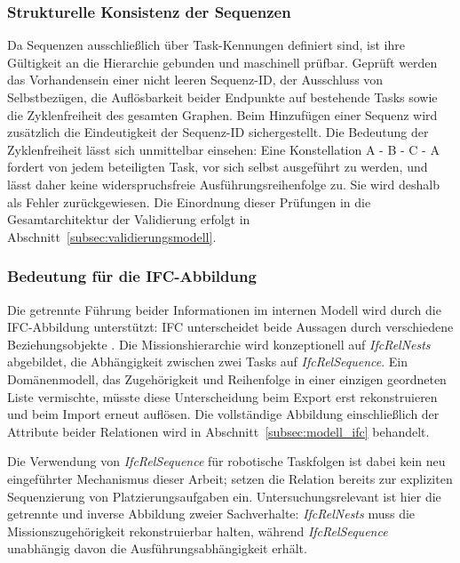 \subsubsection{Strukturelle Konsistenz der Sequenzen}
Da Sequenzen ausschließlich über Task-Kennungen definiert sind, ist ihre Gültigkeit an die
Hierarchie gebunden und maschinell prüfbar. Geprüft werden das Vorhandensein einer nicht leeren
Sequenz-ID, der Ausschluss von Selbstbezügen, die Auflösbarkeit beider Endpunkte auf bestehende
Tasks sowie die Zyklenfreiheit des gesamten Graphen. Beim Hinzufügen einer Sequenz wird zusätzlich
die Eindeutigkeit der Sequenz-ID sichergestellt. Die Bedeutung der Zyklenfreiheit lässt sich
unmittelbar einsehen: Eine Konstellation A - B - C - A
fordert von jedem beteiligten Task, vor sich selbst ausgeführt zu werden, und lässt daher keine
widerspruchsfreie Ausführungsreihenfolge zu. Sie wird deshalb als Fehler zurückgewiesen. Die
Einordnung dieser Prüfungen in die Gesamtarchitektur der Validierung erfolgt in
Abschnitt~\ref{subsec:validierungsmodell}.


\subsubsection{Bedeutung für die IFC-Abbildung}
Die getrennte Führung beider Informationen im internen Modell wird durch die IFC-Abbildung
unterstützt: IFC unterscheidet beide Aussagen durch verschiedene Beziehungsobjekte
\parencite{buildingsmart2024ifc43}. Die
Missionshierarchie wird konzeptionell auf \textit{IfcRelNests} abgebildet,
die Abhängigkeit zwischen zwei Tasks auf \textit{IfcRelSequence}. Ein Domänenmodell, das
Zugehörigkeit und Reihenfolge in einer einzigen geordneten Liste vermischte, müsste diese
Unterscheidung beim Export erst rekonstruieren und beim Import erneut auflösen. Die vollständige
Abbildung einschließlich der Attribute beider Relationen wird in
Abschnitt~\ref{subsec:modell_ifc} behandelt.

Die Verwendung von \textit{IfcRelSequence} für robotische Taskfolgen ist dabei kein neu eingeführter
Mechanismus dieser Arbeit; \textcite{slepicka2026fim} setzen die Relation bereits zur expliziten
Sequenzierung von Platzierungsaufgaben ein. Untersuchungsrelevant ist hier die getrennte und inverse
Abbildung zweier Sachverhalte: \textit{IfcRelNests} muss die Missionszugehörigkeit rekonstruierbar
halten, während \textit{IfcRelSequence} unabhängig davon die Ausführungsabhängigkeit erhält.


